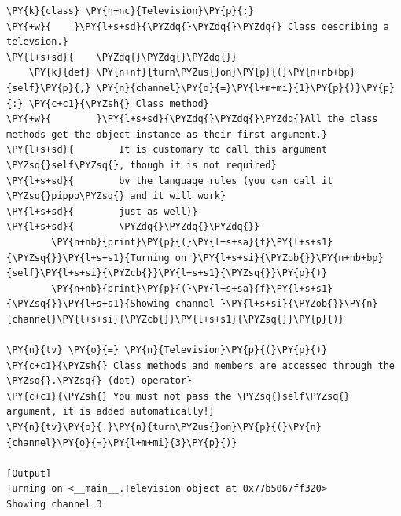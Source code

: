 \begin{Verbatim}[label=\makebox{\url{https://github.com/lucabaldini/cmepda/tree/master/slides/latex/snippets/class\_methods.py}},commandchars=\\\{\}]
\PY{k}{class} \PY{n+nc}{Television}\PY{p}{:}
\PY{+w}{    }\PY{l+s+sd}{\PYZdq{}\PYZdq{}\PYZdq{} Class describing a televsion.}
\PY{l+s+sd}{    \PYZdq{}\PYZdq{}\PYZdq{}}
    \PY{k}{def} \PY{n+nf}{turn\PYZus{}on}\PY{p}{(}\PY{n+nb+bp}{self}\PY{p}{,} \PY{n}{channel}\PY{o}{=}\PY{l+m+mi}{1}\PY{p}{)}\PY{p}{:} \PY{c+c1}{\PYZsh{} Class method}
\PY{+w}{        }\PY{l+s+sd}{\PYZdq{}\PYZdq{}\PYZdq{}All the class methods get the object instance as their first argument.}
\PY{l+s+sd}{        It is customary to call this argument \PYZsq{}self\PYZsq{}, though it is not required}
\PY{l+s+sd}{        by the language rules (you can call it \PYZsq{}pippo\PYZsq{} and it will work}
\PY{l+s+sd}{        just as well)}
\PY{l+s+sd}{        \PYZdq{}\PYZdq{}\PYZdq{}}
        \PY{n+nb}{print}\PY{p}{(}\PY{l+s+sa}{f}\PY{l+s+s1}{\PYZsq{}}\PY{l+s+s1}{Turning on }\PY{l+s+si}{\PYZob{}}\PY{n+nb+bp}{self}\PY{l+s+si}{\PYZcb{}}\PY{l+s+s1}{\PYZsq{}}\PY{p}{)}
        \PY{n+nb}{print}\PY{p}{(}\PY{l+s+sa}{f}\PY{l+s+s1}{\PYZsq{}}\PY{l+s+s1}{Showing channel }\PY{l+s+si}{\PYZob{}}\PY{n}{channel}\PY{l+s+si}{\PYZcb{}}\PY{l+s+s1}{\PYZsq{}}\PY{p}{)}

\PY{n}{tv} \PY{o}{=} \PY{n}{Television}\PY{p}{(}\PY{p}{)}
\PY{c+c1}{\PYZsh{} Class methods and members are accessed through the \PYZsq{}.\PYZsq{} (dot) operator}
\PY{c+c1}{\PYZsh{} You must not pass the \PYZsq{}self\PYZsq{} argument, it is added automatically!}
\PY{n}{tv}\PY{o}{.}\PY{n}{turn\PYZus{}on}\PY{p}{(}\PY{n}{channel}\PY{o}{=}\PY{l+m+mi}{3}\PY{p}{)}

[Output]
Turning on <__main__.Television object at 0x77b5067ff320>
Showing channel 3
\end{Verbatim}